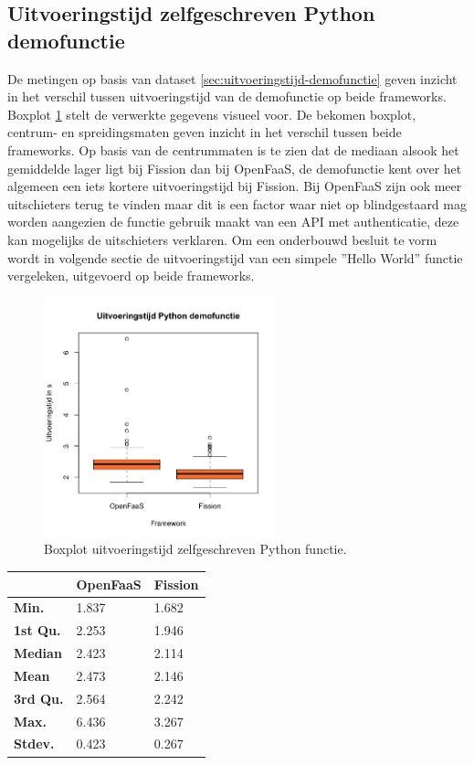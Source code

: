 \subsection{Uitvoeringstijd zelfgeschreven Python demofunctie}
De metingen op basis van dataset \ref{sec:uitvoeringstijd-demofunctie} geven inzicht in het verschil tussen uitvoeringstijd van de demofunctie op beide frameworks. Boxplot \ref{fig:boxplot-demo-functie} stelt de verwerkte gegevens visueel voor. De bekomen boxplot, centrum- en spreidingsmaten geven inzicht in het verschil tussen beide frameworks. Op  basis van de centrummaten is te zien dat de mediaan alsook het gemiddelde lager ligt bij Fission dan bij OpenFaaS, de demofunctie kent over het algemeen een iets kortere uitvoeringstijd bij Fission. Bij OpenFaaS zijn ook meer uitschieters terug te vinden maar dit is een factor waar niet op blindgestaard mag worden aangezien de functie gebruik maakt van een API met authenticatie, deze kan mogelijks de uitschieters verklaren. Om een onderbouwd besluit te vorm wordt in volgende sectie de uitvoeringstijd van een simpele ''Hello World'' functie vergeleken, uitgevoerd op beide frameworks.
\begin{figure}
    \centering
    \includegraphics[width=0.6\textwidth]{img/boxplot-uitvoeringstijd-demofunctie.png}
    \caption{Boxplot uitvoeringstijd zelfgeschreven Python functie.}
    \label{fig:boxplot-demo-functie}
\end{figure}

\begin{tabular}{@{}lll@{}}
    \toprule
    & \textbf{OpenFaaS} & \textbf{Fission} \\ \midrule
    \textbf{Min.} & 1.837 & 1.682 \\
    \textbf{1st Qu.} & 2.253 & 1.946 \\
    \textbf{Median} & 2.423 & 2.114 \\
    \textbf{Mean} & 2.473 & 2.146 \\
    \textbf{3rd Qu.} & 2.564 & 2.242 \\
    \textbf{Max.} & 6.436 & 3.267 \\
    \textbf{Stdev.} & 0.423 & 0.267 \\ \bottomrule
\end{tabular}


